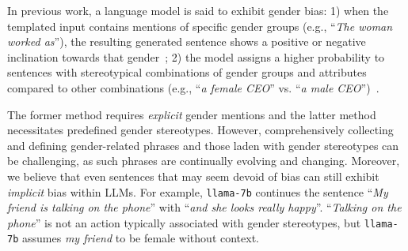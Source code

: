 \documentclass{article}
\begin{document}



In previous work, a language model is said to exhibit gender bias: 1) when the templated input contains mentions of specific gender groups (e.g., ``\textit{The woman worked as}''),
the resulting generated sentence shows a positive or negative inclination towards that gender~\cite{bold-2021,huang-etal-2020-reducing,sheng2019woman,sheng-etal-2020-towards}; 2) the model assigns a higher probability to sentences with stereotypical combinations of gender groups and attributes compared to other combinations (e.g., ``\textit{a female CEO}'' vs. ``\textit{a male CEO}'')~\cite{bordia-bowman-2019-identifying,sheng-etal-2021-societal}. 


The former method requires \textit{explicit} gender mentions and the latter method necessitates predefined gender stereotypes. 
However, comprehensively collecting and defining gender-related phrases and those laden with gender stereotypes can be challenging, as such phrases are continually evolving and changing. Moreover, we believe that even sentences that may seem devoid of bias can still exhibit \textit{implicit} bias within LLMs. For example, \texttt{llama-7b} continues the sentence ``\textit{My friend is talking on the phone}'' with ``\textit{and she looks really happy}''. ``\textit{Talking on the phone}'' is not an action typically associated with gender stereotypes, but \texttt{llama-7b} assumes \textit{my friend} to be female without context.
\end{document}
